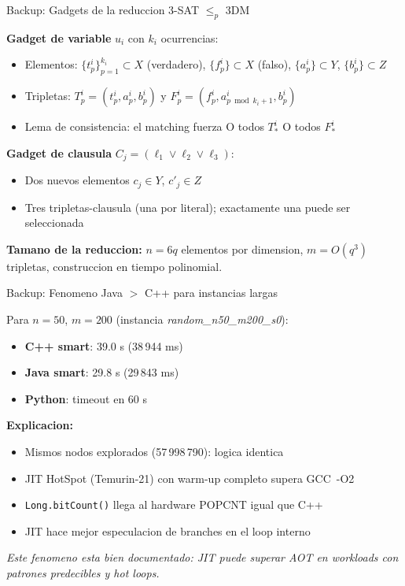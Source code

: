\begin{frame}{Backup: Gadgets de la reduccion 3-SAT $\le_p$ 3DM}

\textbf{Gadget de variable} $u_i$ con $k_i$ ocurrencias:
\begin{itemize}
  \item Elementos: $\{t^i_p\}_{p=1}^{k_i} \subset X$ (verdadero), $\{f^i_p\} \subset X$ (falso), $\{a^i_p\}\subset Y$, $\{b^i_p\}\subset Z$
  \item Tripletas: $T^i_p = (t^i_p, a^i_p, b^i_p)$ y $F^i_p = (f^i_p, a^i_{p \bmod k_i+1}, b^i_p)$
  \item Lema de consistencia: el matching fuerza O todos $T^i_*$ O todos $F^i_*$
\end{itemize}

\medskip
\textbf{Gadget de clausula} $C_j = (\ell_1 \vee \ell_2 \vee \ell_3)$:
\begin{itemize}
  \item Dos nuevos elementos $c_j \in Y$, $c'_j \in Z$
  \item Tres tripletas-clausula (una por literal); exactamente una puede ser seleccionada
\end{itemize}

\medskip
\textbf{Tamano de la reduccion:} $n = 6q$ elementos por dimension, $m = O(q^3)$ tripletas, construccion en tiempo polinomial.

\end{frame}

\begin{frame}{Backup: Fenomeno Java $>$ C++ para instancias largas}

Para $n{=}50$, $m{=}200$ (instancia \textit{random\_n50\_m200\_s0}):
\begin{itemize}
  \item \textbf{C++ smart}: 39.0 s (38\,944 ms)
  \item \textbf{Java smart}: 29.8 s (29\,843 ms)
  \item \textbf{Python}: timeout en 60 s
\end{itemize}

\medskip
\textbf{Explicacion:}
\begin{itemize}
  \item Mismos nodos explorados (57\,998\,790): logica identica
  \item JIT HotSpot (Temurin-21) con warm-up completo supera GCC~-O2
  \item \texttt{Long.bitCount()} llega al hardware POPCNT igual que C++
  \item JIT hace mejor especulacion de branches en el loop interno
\end{itemize}

\medskip
\small\textit{Este fenomeno esta bien documentado: JIT puede superar AOT en workloads con patrones predecibles y hot loops.}

\end{frame}

